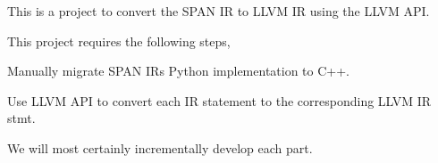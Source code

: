 This is a project to convert the S\+P\+AN IR to L\+L\+VM IR using the L\+L\+VM A\+PI.

This project requires the following steps,
\begin{DoxyEnumerate}
\item Manually migrate S\+P\+AN IR\textquotesingle{}s Python implementation to C++.
\item Use L\+L\+VM A\+PI to convert each IR statement to the corresponding L\+L\+VM IR stmt.
\end{DoxyEnumerate}

We will most certainly incrementally develop each part. 
